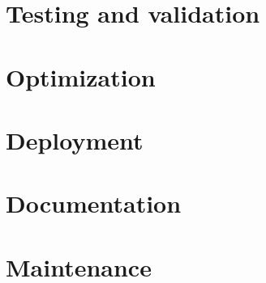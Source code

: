 \section{Testing and validation}


\section{Optimization}


\section{Deployment}


\section{Documentation}


\section{Maintenance}